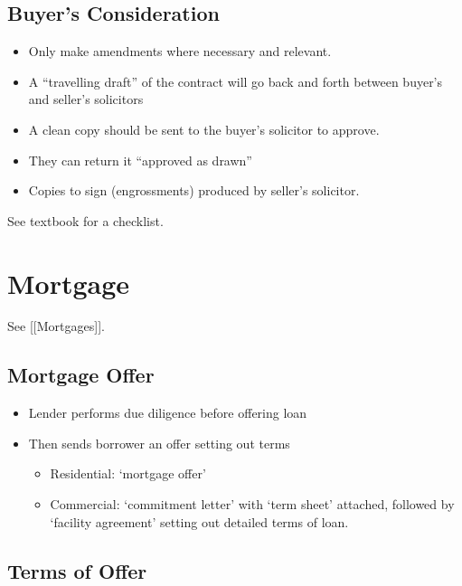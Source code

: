 \documentclass[
]{article}
\providecommand{\tightlist}{%
  \setlength{\itemsep}{0pt}\setlength{\parskip}{0pt}}
\begin{document}
\hypertarget{buyers-consideration}{%
\subsection{Buyer's Consideration}\label{buyers-consideration}}

\begin{itemize}
\tightlist
\item
  Only make amendments where necessary and relevant.
\item
  A ``travelling draft'' of the contract will go back and forth between
  buyer's and seller's solicitors
\item
  A clean copy should be sent to the buyer's solicitor to approve.
\item
  They can return it ``approved as drawn''
\item
  Copies to sign (engrossments) produced by seller's solicitor.
\end{itemize}

See textbook for a checklist.

\hypertarget{mortgage}{%
\section{Mortgage}\label{mortgage}}

See {[}{[}Mortgages{]}{]}.

\hypertarget{mortgage-offer}{%
\subsection{Mortgage Offer}\label{mortgage-offer}}

\begin{itemize}
\tightlist
\item
  Lender performs due diligence before offering loan
\item
  Then sends borrower an offer setting out terms

  \begin{itemize}
  \tightlist
  \item
    Residential: `mortgage offer'
  \item
    Commercial: `commitment letter' with `term sheet' attached, followed
    by `facility agreement' setting out detailed terms of loan.
  \end{itemize}
\end{itemize}

\hypertarget{terms-of-offer}{%
\subsection{Terms of Offer}\label{terms-of-offer}}
\end{document}

